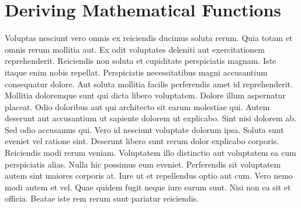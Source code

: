 \documentclass[
	11pt, %
	fleqn, %
	letterpaper, %
]{CommodoreBlueBook}
\begin{document}
\chapter*{Deriving Mathematical Functions}

Voluptas nesciunt vero omnis ex reiciendis ducimus soluta rerum. Quia totam et
omnis rerum mollitia aut. Ex odit voluptates deleniti aut exercitationem
reprehenderit. Reiciendis non soluta et cupiditate perspiciatis magnam. Iste
itaque enim nobis repellat. Perspiciatis necessitatibus magni accusantium
consequatur dolore. Aut soluta mollitia facilis perferendis amet id
reprehenderit. Mollitia doloremque sunt qui dicta libero voluptatem. Dolore
illum aspernatur placeat. Odio doloribus aut qui architecto sit earum molestiae
qui. Autem deserunt aut accusantium ut sapiente dolorem ut explicabo. Sint nisi
dolorem ab. Sed odio accusamus qui. Vero id nesciunt voluptate dolorum ipsa.
Soluta sunt eveniet vel ratione sint. Deserunt libero sunt rerum dolor
explicabo corporis. Reiciendis modi rerum veniam. Voluptatem illo distinctio
aut voluptatem ea cum perspiciatis alias. Nulla hic possimus eum eveniet.
Perferendis sit voluptatem autem sint maiores corporis at. Iure ut et
repellendus optio aut cum. Vero nemo modi autem et vel. Quae quidem fugit neque
iure earum sunt. Nisi non ea sit et officia. Beatae iste rem rerum sunt
pariatur reiciendis.



\@openrighttrue\makeatother

\stopcontents[part] %


\cleardoublepage %
{} %
\printindex %
\end{document}
